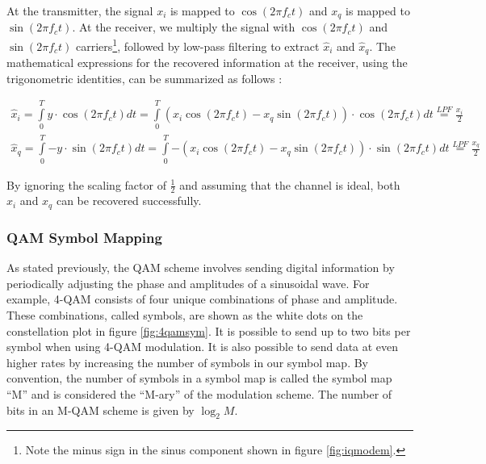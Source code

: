 \documentclass[12pt,a4paper,openright]{report}
\begin{document}
At the transmitter, the signal $x_i$ is mapped to $\cos (2\pi {f_c}t)$ and $x_q$ is mapped to $\sin (2\pi {f_c}t)$. At the receiver, we multiply the signal with $\cos (2\pi {f_c}t)$ and $\sin (2\pi {f_c}t)$ carriers\footnote{Note the minus sign in the sinus component shown in figure \ref{fig:iqmodem}.}, followed by low-pass filtering to extract $\hat{x}_i$ and $\hat{x}_q$. The mathematical expressions for the recovered information at the receiver, using the trigonometric identities, can be summarized as follows \cite{Madhow}: 

\begin{eqnarray}
{{\hat x}_i} = \int\limits_0^T {y \cdot \cos (2\pi {f_c}t)dt = } \int\limits_0^T {\left( {{x_i}\cos (2\pi {f_c}t) - {x_q}\sin (2\pi {f_c}t)} \right) \cdot \cos (2\pi {f_c}t)dt\mathop  = \limits^{LPF} \frac{{{x_i}}}{2}}\\
{{\hat x}_q} = \int\limits_0^T { - y\cdot \sin (2\pi {f_c}t)dt = } \int\limits_0^T { - \left( {{x_i}\cos (2\pi {f_c}t) - {x_q}\sin (2\pi {f_c}t)} \right) \cdot \sin (2\pi {f_c}t)dt\mathop  = \limits^{LPF} \frac{{{x_q}}}{2}} 
\end{eqnarray}

By ignoring the scaling factor of $\frac{1}{2}$ and assuming that the channel is ideal, both $x_i$ and $x_q$ can be recovered successfully. 

\subsubsection{QAM Symbol Mapping}

As stated previously, the QAM scheme involves sending digital information by periodically adjusting the phase and amplitudes of a sinusoidal wave. For example, 4-QAM consists of four unique combinations of phase and amplitude. These combinations, called symbols, are shown as the white dots on the constellation plot in figure \ref{fig:4qamsym}. It is possible to send up to two bits per symbol when using 4-QAM modulation. It is also possible to send data at even higher rates by increasing the number of symbols in our symbol map. By convention, the number of symbols in a symbol map is called the symbol map “M” and is considered the “M-ary” of the modulation scheme. The number of bits in an M-QAM scheme is given by ${{{\log }_2}M}$. 
\end{document}
